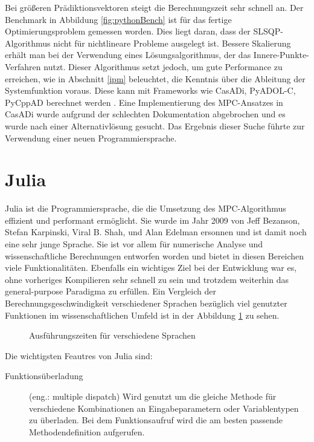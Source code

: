 \documentclass{like}
\begin{document}
Bei größeren Prädiktionsvektoren steigt die Berechnungszeit sehr schnell an. Der Benchmark in Abbildung \ref{fig:pythonBench} ist für das fertige Optimierungsproblem gemessen worden.
Dies liegt daran, dass der \ac{SLSQP}-Algorithmus nicht für nichtlineare Probleme ausgelegt ist. Bessere Skalierung erhält man bei der Verwendung eines Lösungsalgorithmus, der das Innere-Punkte-Verfahren nutzt. Dieser Algorithmus setzt jedoch, um gute Performance zu erreichen, wie in Abschnitt \ref{ipm} beleuchtet, die Kenntnis über die Ableitung der Systemfunktion voraus. Diese kann mit Frameworks wie CasADi, PyADOL-C, PyCppAD berechnet werden \cite{DBLP:journals/corr/TurkinT16}. 
Eine Implementierung des \ac{MPC}-Ansatzes in CasADi wurde  aufgrund der schlechten Dokumentation abgebrochen und es wurde nach einer Alternativlösung gesucht. Das Ergebnis dieser Suche führte zur Verwendung einer neuen Programmiersprache. 


\section{Julia}
\label{julia}
Julia ist die Programmiersprache, die die Umsetzung des \acl{MPC}-Algorithmus effizient und performant ermöglicht. Sie wurde im Jahr 2009 von Jeff Bezanson, Stefan Karpinski, Viral B. Shah, und Alan Edelman ersonnen und ist damit noch eine sehr junge Sprache. Sie ist vor allem für numerische Analyse und wissenschaftliche Berechnungen entworfen worden und bietet in diesen Bereichen viele Funktionalitäten. Ebenfalls ein wichtiges Ziel bei der Entwicklung war es, ohne vorheriges Kompilieren sehr schnell zu sein und trotzdem weiterhin das general-purpose Paradigma zu erfüllen. Ein Vergleich der Berechnungsgeschwindigkeit verschiedener Sprachen bezüglich viel genutzter Funktionen im wissenschaftlichen Umfeld ist in der Abbildung \ref{fig:juliaBench} zu sehen.

\begin{figure}[ht!]
	\centering
	 
	\caption{Ausführungszeiten für verschiedene Sprachen}
	\label{fig:juliaBench}
\end{figure}

Die wichtigsten Feautres von Julia sind:
\begin{description}
	\item[Funktionsüberladung] (eng.: multiple dispatch) Wird genutzt um die gleiche Methode für verschiedene Kombinationen an Eingabeparametern oder Variablentypen zu überladen. Bei dem Funktionsaufruf wird die am besten passende Methodendefinition aufgerufen.
\end{description}
\end{document}

